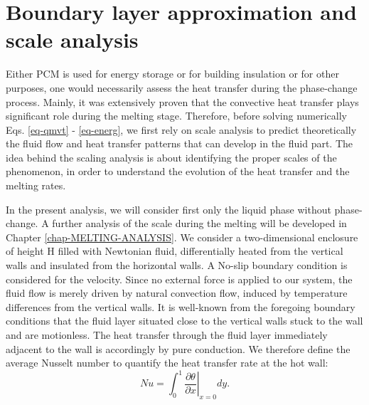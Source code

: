 
\section{Boundary layer approximation and scale analysis} \label{sec-bound-scal-anal}
Either PCM is used for energy storage or for building insulation or for other purposes, one would necessarily assess the heat transfer during the phase-change process.
Mainly, it was extensively proven that the convective heat transfer plays significant role during the melting stage.
Therefore, before solving numerically Eqs. \ref{eq-qmvt} - \ref{eq-energ}, we first rely on scale analysis to predict theoretically the fluid flow and heat transfer patterns that can develop in the fluid part.
The idea behind the scaling analysis is about identifying the proper scales of the phenomenon, in order to understand the evolution of the heat transfer and the melting rates.

In the present analysis, we will consider first only the liquid phase without phase-change.
A further analysis of the scale during the melting will be developed in Chapter \ref{chap-MELTING-ANALYSIS}.
We consider a two-dimensional enclosure of height H filled with Newtonian fluid, differentially heated from the vertical walls and insulated from the horizontal walls.
A No-slip boundary condition is considered for the velocity. 
Since no external force is applied to our system, the fluid flow is merely driven by natural convection flow, induced by temperature differences from the vertical walls.
It is well-known from the foregoing boundary conditions that the fluid layer situated close to the vertical walls stuck to the wall and are motionless.
The heat transfer through the fluid layer immediately adjacent to the wall is accordingly by pure conduction.
We therefore define the average Nusselt number to quantify the heat transfer rate at the hot wall:
\begin{equation}\label{eq-def-Nu}
   N\!u = \int_0^1 \left. \frac{\partial \theta}{\partial x} \right |_{x=0} dy.
\end{equation}

